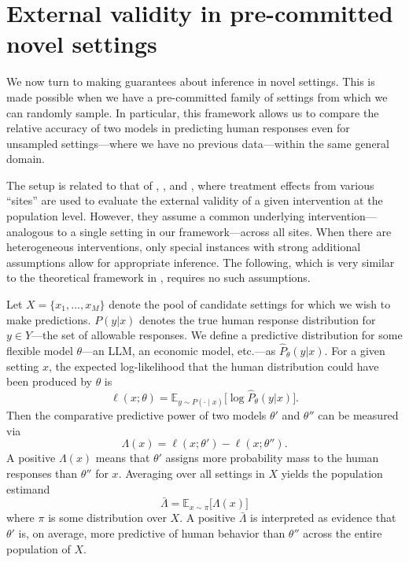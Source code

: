 \section{External validity in pre-committed novel settings}
\label{sec:ext-valid}

We now turn to making guarantees about inference in novel settings.
This is made possible when we have a pre-committed family of settings from which we can randomly sample.
In particular, this framework allows us to compare the relative accuracy of two models in predicting human responses even for unsampled settings---where we have no previous data---within the same general domain.

The setup is related to that of \cite{Hotz2005PredictingEfficacy}, \cite{Allcott2015Site}, and \cite{Dehejia2019External}, where treatment effects from various ``sites'' are used to evaluate the external validity of a given intervention at the population level.
However, they assume a common underlying intervention---analogous to a single setting in our framework---across all sites.
When there are heterogeneous interventions, only special instances with strong additional assumptions allow for appropriate inference.
The following, which is very similar to the theoretical framework in \cite{andrews2025transfer}, requires no such assumptions.

Let $X=\{x_{1},\dots,x_{M}\}$ denote the pool of candidate settings for which we wish to make predictions.
$P(y|x)$ denotes the true human response distribution for $y \in Y$---the set of allowable responses.
We define a predictive distribution for some flexible model $\theta$---an LLM, an economic model, etc.---as $\hat P_{\theta}(y|x)$.
For a given setting $x$, the expected log-likelihood that the human distribution could have been produced by $\theta$ is
\[
\ell(x;\theta) = \mathbb{E}_{y\sim P(\cdot\mid x)}\bigl[\log\hat P_{\theta}(y|x)\bigr].
\]
Then the comparative predictive power of two models $\theta'$ and $\theta''$ can be measured via
\begin{equation} \label{eq:ratio}
  \Lambda(x) = \ell(x;\theta') - \ell(x;\theta'').
\end{equation}
A positive $\Lambda(x)$ means that $\theta'$ assigns more probability mass to the human responses than $\theta''$ for $x$.
Averaging over all settings in $X$ yields the population estimand
\begin{equation} \label{eq:avg-ratio}
\bar{\Lambda} = \mathbb{E}_{x\sim\pi}\bigl[\Lambda(x)\bigr]
\end{equation}
where $\pi$ is some distribution over $X$.
A positive $\bar{\Lambda}$ is interpreted as evidence that $\theta'$ is, on average, more predictive of human behavior than $\theta''$ across the entire population of $X$.

